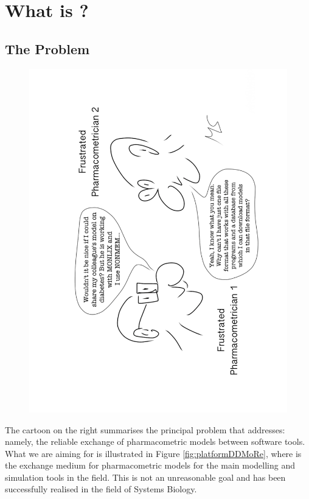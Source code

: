 \newcommand{\matlab}{MATLAB\textsuperscript{\textregistered}}
\chapter{What is \pharmml?}
\label{chap:pharmml-what}

\section{The Problem}
\begin{figure}
  \includegraphics[angle=270,width=\linewidth,trim=90mm 80mm 80mm 50mm]{figures/MMLdudesFinal2}
\end{figure}

The cartoon on the right summarises the principal problem that \pharmml addresses: namely,
the reliable exchange of pharmacometric models between software tools. What we are aiming
for is illustrated in Figure \ref{fig:platformDDMoRe}, where \pharmml is the exchange medium
for pharmacometric models for the main modelling and simulation tools in the field. This is
not an unreasonable goal and has been successfully realised in the field of Systems Biology.


